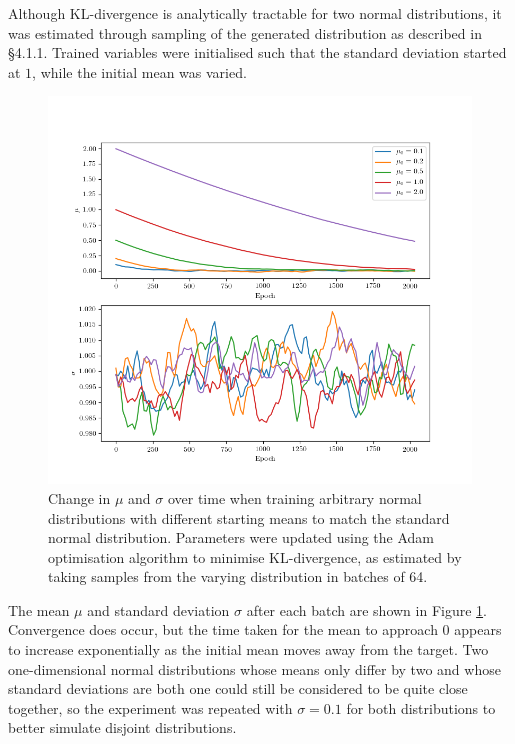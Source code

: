 \documentclass[../../main.tex]{subfiles}
\begin{document}
Although KL-divergence is analytically tractable for two normal distributions, it was estimated through sampling of the generated distribution as described in \S 4.1.1.
Trained variables were initialised such that the standard deviation started at $1$, while the initial mean was varied.
\begin{figure}[H]
    \begin{center}
    \includegraphics[width=\textwidth]{broadKLDivergence}
    \caption{
        Change in $\mu$ and $\sigma$ over time when training arbitrary normal distributions with different starting means to match the standard normal distribution. 
        Parameters were updated using the Adam optimisation algorithm to minimise KL-divergence, as estimated by taking samples from the varying distribution in batches of 64.
    }
    \label{fig:broadKLDivergence}
    \end{center}
\end{figure}
The mean $\mu$ and standard deviation $\sigma$ after each batch are shown in Figure \ref{fig:broadKLDivergence}.
Convergence does occur, but the time taken for the mean to approach $0$ appears to increase exponentially as the initial mean moves away from the target.
Two one-dimensional normal distributions whose means only differ by two and whose standard deviations are both one could still be considered to be quite close together, so the experiment was repeated with $\sigma=0.1$ for both distributions to better simulate disjoint distributions.
\end{document}
